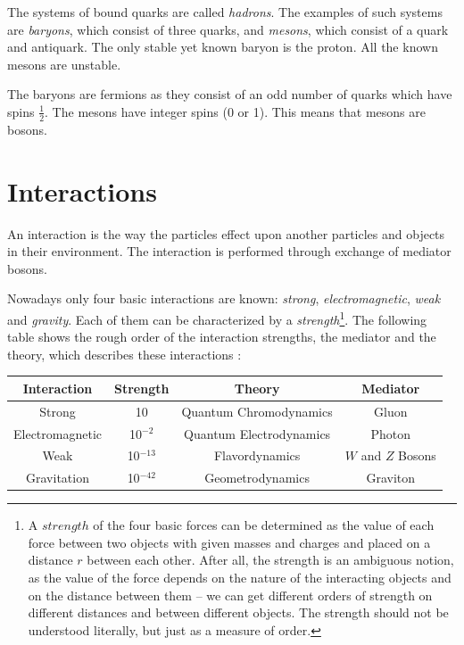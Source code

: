 The systems of bound quarks are called \textit{hadrons}. The examples of such systems are 
\textit{baryons}, which consist of three quarks, and \textit{mesons}, which consist of a quark and antiquark. The only stable yet known baryon 
is the proton. All the known mesons are unstable.

The baryons are fermions as they consist of an odd number of quarks which have spins $\frac{1}{2}$. The mesons have integer spins
(0 or 1). This means that mesons are bosons.

\section{Interactions}

An interaction is the way the particles effect upon another particles and objects in their environment. The interaction is performed through exchange
of mediator bosons.

Nowadays only four basic interactions are known: \textit{strong}, \textit{electromagnetic}, \textit{weak} and \textit{gravity}. 
Each of them can be characterized by a \textit{strength}\footnote{A $strength$\cite{griffiths2008introduction} of the four basic forces can be determined as the value of each force
between two objects with given masses and charges and placed on a distance $r$ between each other. After all, the strength is an ambiguous notion, as the 
value of the force depends on the nature of the interacting objects and on the distance between them -- we can get different orders of strength on different
distances  and between different objects. The strength should not be understood literally, but just as a measure of order.}.
The following table shows the rough order of the interaction strengths, the mediator
and the theory, which describes these interactions \cite{griffiths2008introduction}:

\begin{center}\label{tab:forces}
  \begin{tabular}{ | c | c | c | c | }
    \hline
    \textbf{Interaction} & \textbf{Strength} & \textbf{Theory} & \textbf{Mediator} \\ \hline \hline
    Strong & 10 & Quantum Chromodynamics & Gluon \\ \hline 
    Electromagnetic & 10$^{-2}$ & Quantum Electrodynamics & Photon \\ \hline
    Weak & 10$^{-13}$ & Flavordynamics & $W$ and $Z$ Bosons \\ \hline
    Gravitation & 10$^{-42}$ & Geometrodynamics & Graviton \\
    \hline
  \end{tabular}
\end{center}

